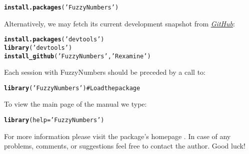\documentclass[11pt]{article}\usepackage{graphicx, color}
\makeatletter
\newcommand{\hlfunctioncall}[1]{\textcolor[rgb]{0.501960784313725,0,0.329411764705882}{\textbf{#1}}}%
\newcommand{\hlstring}[1]{\textcolor[rgb]{0.6,0.6,1}{#1}}%
\newcommand{\hlcomment}[1]{\textcolor[rgb]{0.180392156862745,0.6,0.341176470588235}{#1}}%
\newenvironment{kframe}{%
 \def\at@end@of@kframe{}%
 \ifinner\ifhmode%
  \def\at@end@of@kframe{\end{minipage}}%
  \begin{minipage}{\columnwidth}%
 \fi\fi%
 \def\FrameCommand##1{\hskip\@totalleftmargin \hskip-\fboxsep
 \colorbox{shadecolor}{##1}\hskip-\fboxsep
     \hskip-\linewidth \hskip-\@totalleftmargin \hskip\columnwidth}%
 \MakeFramed {\advance\hsize-\width
   \@totalleftmargin\z@ \linewidth\hsize
   \@setminipage}}%
 {\par\unskip\endMakeFramed%
 \at@end@of@kframe}
\newenvironment{knitrout}{}{} %
\newcommand{\package}[1]{\textsf{#1}\xspace}
\makeatother
\begin{document}
\begin{knitrout}\small
{}\color{fgcolor}\begin{kframe}
\begin{alltt}
\hlfunctioncall{install.packages}(\hlstring{'FuzzyNumbers'})
\end{alltt}
\end{kframe}
\end{knitrout}


\noindent
Alternatively, we may fetch its current development snapshot
from \href{https://github.com/Rexamine/FuzzyNumbers}{\textit{GitHub}}:

\begin{knitrout}\small
{}\color{fgcolor}\begin{kframe}
\begin{alltt}
\hlfunctioncall{install.packages}(\hlstring{'devtools'})
\hlfunctioncall{library}(\hlstring{'devtools'})
\hlfunctioncall{install_github}(\hlstring{'FuzzyNumbers'}, \hlstring{'Rexamine'})
\end{alltt}
\end{kframe}
\end{knitrout}



\bigskip
Each session with \package{FuzzyNumbers} should be preceded by
a call to:

\begin{knitrout}\small
{}\color{fgcolor}\begin{kframe}
\begin{alltt}
\hlfunctioncall{library}(\hlstring{'FuzzyNumbers'}) \hlcomment{# Load the package}
\end{alltt}
\end{kframe}
\end{knitrout}


\bigskip
To view the main page of the manual we type:

\begin{knitrout}\small
{}\color{fgcolor}\begin{kframe}
\begin{alltt}
\hlfunctioncall{library}(help=\hlstring{'FuzzyNumbers'})
\end{alltt}
\end{kframe}
\end{knitrout}


\noindent
For more information please visit the package's homepage \cite{Gagolewski:FuzzyNumbersHome}.
In case of any problems, comments, or suggestions feel free to contact the author.
Good luck!
\end{document}
